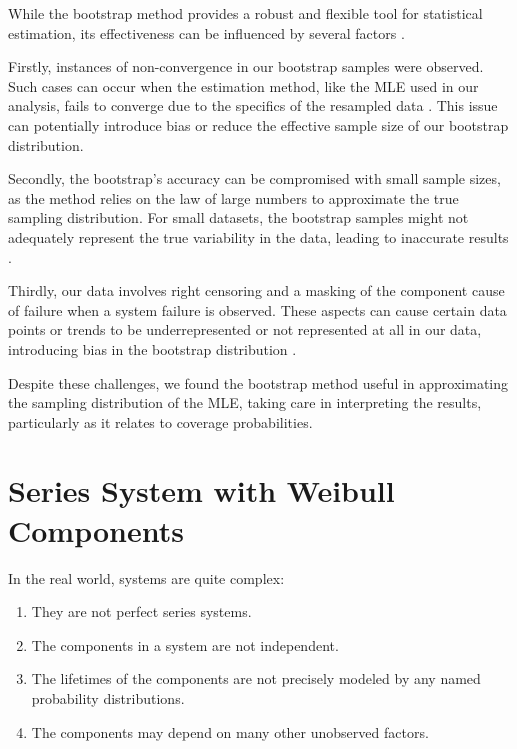 \documentclass[
]{article}
\begin{document}
While the bootstrap method provides a robust and flexible tool for
statistical estimation, its effectiveness can be influenced by several
factors \citep{efron1994introduction}.

Firstly, instances of non-convergence in our bootstrap samples were
observed. Such cases can occur when the estimation method, like the MLE
used in our analysis, fails to converge due to the specifics of the
resampled data \citep{casella2002statistical}. This issue can
potentially introduce bias or reduce the effective sample size of our
bootstrap distribution.

Secondly, the bootstrap's accuracy can be compromised with small sample
sizes, as the method relies on the law of large numbers to approximate
the true sampling distribution. For small datasets, the bootstrap
samples might not adequately represent the true variability in the data,
leading to inaccurate results \citep{efron1994introduction}.

Thirdly, our data involves right censoring and a masking of the
component cause of failure when a system failure is observed. These
aspects can cause certain data points or trends to be underrepresented
or not represented at all in our data, introducing bias in the bootstrap
distribution \citep{klein2005survival}.

Despite these challenges, we found the bootstrap method useful in
approximating the sampling distribution of the MLE, taking care in
interpreting the results, particularly as it relates to coverage
probabilities.

\hypertarget{sec:weibull}{%
\section{Series System with Weibull Components}\label{sec:weibull}}

In the real world, systems are quite complex:

\begin{enumerate}
\def\labelenumi{\arabic{enumi}.}
\item
  They are not perfect series systems.
\item
  The components in a system are not independent.
\item
  The lifetimes of the components are not precisely modeled by any named
  probability distributions.
\item
  The components may depend on many other unobserved factors.
\end{enumerate}
\end{document}
